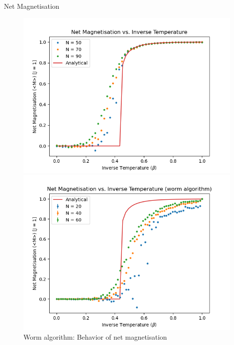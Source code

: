 \documentclass{beamer}
\begin{document}
\begin{frame}{Net Magnetisation}
    \begin{figure}[htbp]
	\begin{center}
		\begin{minipage}[t]{0.49\linewidth}
			\centering
			\includegraphics[width=\linewidth]{metro_netmag-beta.png}
            \caption{Metropolis algorithm: Behavior of net magnetisation}
		\end{minipage}
		\begin{minipage}[t]{0.49\linewidth}
			\centering
			\includegraphics[width=\linewidth]{worm_netmag-beta.png}
		  \caption{Worm algorithm: Behavior of net magnetisation}
        \end{minipage}
	\end{center}
    \end{figure}
\end{frame}
\end{document}
